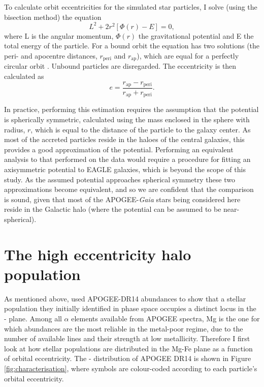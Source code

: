 To calculate orbit eccentricities for the simulated star particles,
I solve (using the bisection method) the equation
\begin{equation}
L^2 + 2 r^2 [\Phi(r) - E] = 0 ,
\end{equation}
where L is the angular momentum, $\Phi(r)$ the gravitational potential
and E the total energy of the particle. For a bound orbit the
equation has two solutions (the peri- and apocentre distances, $r_\mathrm{peri}$
and $r_\mathrm{ap}$), which are equal for a perfectly circular orbit \citep[][eq.
3.14]{2008gady.book.....B}. Unbound particles are disregarded.  The
eccentricity is then calculated as
\begin{equation}
e = \frac{r_\mathrm{ap}-r_\mathrm{peri} }{r_\mathrm{ap}+r_\mathrm{peri} }.
\end{equation}

In practice, performing this estimation requires the assumption
that the potential is spherically symmetric, calculated using the
mass enclosed in the sphere with radius, $r$, which is equal
to the distance of the particle to the galaxy center. As most of
the accreted particles reside in the haloes of the central galaxies,
this provides a good approximation of the potential. Performing an
equivalent analysis to that performed on the data would require a
procedure for fitting an axisymmetric potential to EAGLE galaxies,
which is beyond the scope of this study. As the assumed potential
approaches spherical symmetry these two approximations become
equivalent, and so we are confident that the comparison is sound,
given that most of the APOGEE-\emph{Gaia} stars being considered
here reside in the Galactic halo (where the potential can be assumed
to be near-spherical).


\section{The high eccentricity halo population} \label{highe}

As mentioned above, \citet{2018arXiv180606038H} used APOGEE-DR14
abundances to show that a stellar population they initially identified
in phase space occupies a distinct locus in the \afe{}-\feh{} plane.
Among all $\alpha$ elements available from APOGEE spectra, 
Mg is the one for which abundances are the most reliable in the
metal-poor regime, due to the number of available lines and their
strength at low metallicity.  Therefore I first look at
how stellar populations are distributed in the Mg-Fe plane as a
function of orbital eccentricity.  The \mgfe{}-\feh{}
distribution of APOGEE DR14 is shown in Figure \ref{fig:characterisation},
where symbols are colour-coded according to each particle's orbital
eccentricity.


